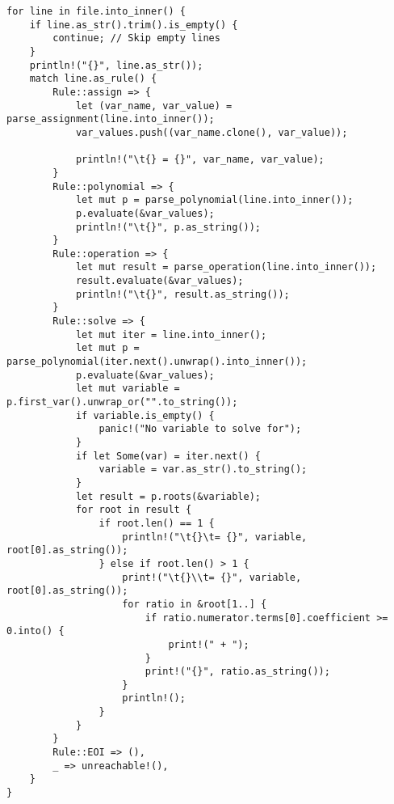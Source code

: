 \begin{lstlisting}[caption={Iterating through the lines of the input file}, label={lst:iterating-input}]
    for line in file.into_inner() {
    if line.as_str().trim().is_empty() {
        continue; // Skip empty lines
    }
    println!("{}", line.as_str());
    match line.as_rule() {
        Rule::assign => {
            let (var_name, var_value) = parse_assignment(line.into_inner());
            var_values.push((var_name.clone(), var_value));

            println!("\t{} = {}", var_name, var_value);
        }
        Rule::polynomial => {
            let mut p = parse_polynomial(line.into_inner());
            p.evaluate(&var_values);
            println!("\t{}", p.as_string());
        }
        Rule::operation => {
            let mut result = parse_operation(line.into_inner());
            result.evaluate(&var_values);
            println!("\t{}", result.as_string());
        }
        Rule::solve => {
            let mut iter = line.into_inner();
            let mut p = parse_polynomial(iter.next().unwrap().into_inner());
            p.evaluate(&var_values);
            let mut variable = p.first_var().unwrap_or("".to_string());
            if variable.is_empty() {
                panic!("No variable to solve for");
            }
            if let Some(var) = iter.next() {
                variable = var.as_str().to_string();
            }
            let result = p.roots(&variable);
            for root in result {
                if root.len() == 1 {
                    println!("\t{}\t= {}", variable, root[0].as_string());
                } else if root.len() > 1 {
                    print!("\t{}\\t= {}", variable, root[0].as_string());
                    for ratio in &root[1..] {
                        if ratio.numerator.terms[0].coefficient >= 0.into() {
                            print!(" + ");
                        }
                        print!("{}", ratio.as_string());
                    }
                    println!();
                }
            }
        }
        Rule::EOI => (),
        _ => unreachable!(),
    }
}
\end{lstlisting}
